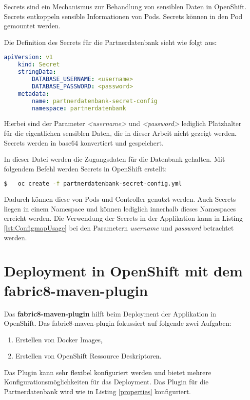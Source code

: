 Secrets sind ein Mechanismus zur Behandlung von sensiblen Daten in OpenShift. Secrets entkoppeln sensible Informationen von Pods. Secrets können in den Pod gemountet werden.

Die Definition des Secrets für die Partnerdatenbank sieht wie folgt aus:
\begin{lstlisting}[language=yml, caption=partnerdatenbank-secret-config.yml]
	apiVersion: v1
	kind: Secret
	stringData:
		DATABASE_USERNAME: <username>
		DATABASE_PASSWORD: <password>
	metadata:
		name: partnerdatenbank-secret-config
		namespace: partnerdatenbank
\end{lstlisting}

Hierbei sind der Parameter \textit{<username>} und \textit{<password>} lediglich Platzhalter für die eigentlichen sensiblen Daten, die in dieser Arbeit nicht gezeigt werden. Secrets werden in base64 konvertiert und gespeichert.

In dieser Datei werden die Zugangsdaten für die Datenbank gehalten. Mit folgendem Befehl werden Secrets in OpenShift erstellt:
\begin{lstlisting}[language=bash]
$ 	oc create -f partnerdatenbank-secret-config.yml
\end{lstlisting}

Dadurch können diese von Pods und Controller genutzt werden. Auch Secrets liegen in einem Namespace und können lediglich innerhalb dieses Namespaces erreicht werden.
Die Verwendung der Secrets in der Applikation kann in Listing \ref{lst:ConfigmapUsage} bei den Parametern \textit{username} und \textit{password} betrachtet werden.


\section{Deployment in OpenShift mit dem fabric8-maven-plugin}
Das \textbf{fabric8-maven-plugin} hilft beim Deployment der Applikation in OpenShift. Das fabric8-maven-plugin  fokussiert auf folgende zwei Aufgaben:
\begin{enumerate}
	\item Erstellen von Docker Images,
	\item Erstellen von OpenShift Ressource Deskriptoren.
\end{enumerate}

Das Plugin kann sehr flexibel konfiguriert werden und bietet mehrere Konfigurationsmöglichkeiten für das Deployment. Das Plugin für die Partnerdatenbank wird wie in Listing \ref{properties} konfiguriert.

